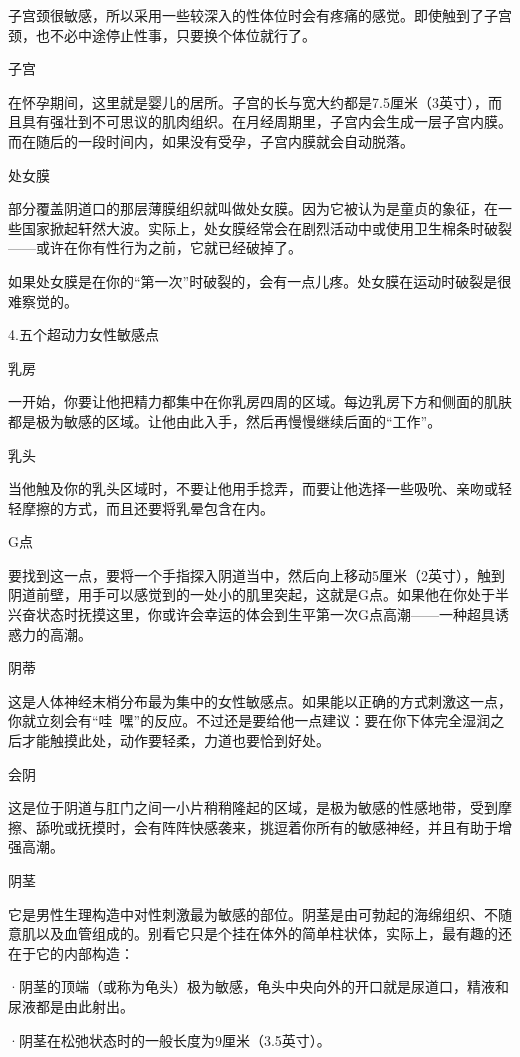 \documentclass[12pt,UTF8,openany]{ctexbook}
\begin{document}
子宫颈很敏感，所以采用一些较深入的性体位时会有疼痛的感觉。即使触到了子宫颈，也不必中途停止性事，只要换个体位就行了。

子宫

在怀孕期间，这里就是婴儿的居所。子宫的长与宽大约都是7.5厘米（3英寸），而且具有强壮到不可思议的肌肉组织。在月经周期里，子宫内会生成一层子宫内膜。而在随后的一段时间内，如果没有受孕，子宫内膜就会自动脱落。

处女膜

部分覆盖阴道口的那层薄膜组织就叫做处女膜。因为它被认为是童贞的象征，在一些国家掀起轩然大波。实际上，处女膜经常会在剧烈活动中或使用卫生棉条时破裂——或许在你有性行为之前，它就已经破掉了。

如果处女膜是在你的“第一次”时破裂的，会有一点儿疼。处女膜在运动时破裂是很难察觉的。

4.五个超动力女性敏感点

乳房

一开始，你要让他把精力都集中在你乳房四周的区域。每边乳房下方和侧面的肌肤都是极为敏感的区域。让他由此入手，然后再慢慢继续后面的“工作”。

乳头

当他触及你的乳头区域时，不要让他用手捻弄，而要让他选择一些吸吮、亲吻或轻轻摩擦的方式，而且还要将乳晕包含在内。

G点

要找到这一点，要将一个手指探入阴道当中，然后向上移动5厘米（2英寸），触到阴道前壁，用手可以感觉到的一处小的肌里突起，这就是G点。如果他在你处于半兴奋状态时抚摸这里，你或许会幸运的体会到生平第一次G点高潮——一种超具诱惑力的高潮。

阴蒂

这是人体神经末梢分布最为集中的女性敏感点。如果能以正确的方式刺激这一点，你就立刻会有“哇~嘿”的反应。不过还是要给他一点建议：要在你下体完全湿润之后才能触摸此处，动作要轻柔，力道也要恰到好处。

会阴

这是位于阴道与肛门之间一小片稍稍隆起的区域，是极为敏感的性感地带，受到摩擦、舔吮或抚摸时，会有阵阵快感袭来，挑逗着你所有的敏感神经，并且有助于增强高潮。


阴茎

它是男性生理构造中对性刺激最为敏感的部位。阴茎是由可勃起的海绵组织、不随意肌以及血管组成的。别看它只是个挂在体外的简单柱状体，实际上，最有趣的还在于它的内部构造：

·阴茎的顶端（或称为龟头）极为敏感，龟头中央向外的开口就是尿道口，精液和尿液都是由此射出。

·阴茎在松弛状态时的一般长度为9厘米（3.5英寸）。
\end{document}

